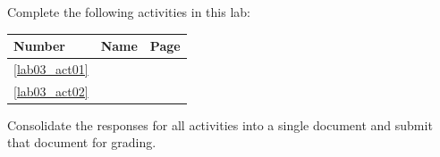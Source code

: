 Complete the following activities in this lab:

\begin{center}
  \begin{tabular}{lll}
    \hline 
    \textbf{Number} & \textbf{Name} & \textbf{Page} \\ 
    \hline 
    \ref{lab03_act01} & \nameref{lab03_act01} & \pageref{lab03_act01} \\ 
    \hline 
    \ref{lab03_act02} & \nameref{lab03_act02} & \pageref{lab03_act02} \\ 
    \hline 
  \end{tabular} 
\end{center}

Consolidate the responses for all activities into a single document and submit that document for grading.
